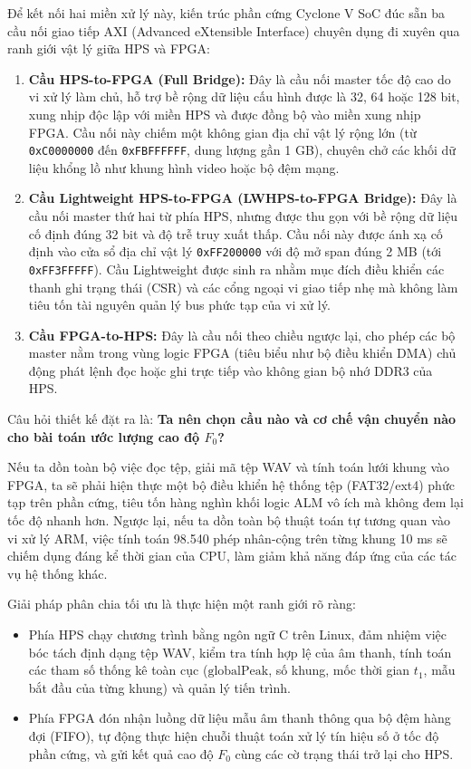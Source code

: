 Để kết nối hai miền xử lý này, kiến trúc phần cứng Cyclone V SoC đúc sẵn ba cầu nối giao tiếp AXI (Advanced eXtensible Interface) chuyên dụng đi xuyên qua ranh giới vật lý giữa HPS và FPGA:
\begin{enumerate}[leftmargin=1.5em, itemsep=3pt]
    \item \textbf{Cầu HPS-to-FPGA (Full Bridge):} Đây là cầu nối master tốc độ cao do vi xử lý làm chủ, hỗ trợ bề rộng dữ liệu cấu hình được là 32, 64 hoặc 128 bit, xung nhịp độc lập với miền HPS và được đồng bộ vào miền xung nhịp FPGA. Cầu nối này chiếm một không gian địa chỉ vật lý rộng lớn (từ \texttt{0xC0000000} đến \texttt{0xFBFFFFFF}, dung lượng gần 1 GB), chuyên chở các khối dữ liệu khổng lồ như khung hình video hoặc bộ đệm mạng.
    \item \textbf{Cầu Lightweight HPS-to-FPGA (LWHPS-to-FPGA Bridge):} Đây là cầu nối master thứ hai từ phía HPS, nhưng được thu gọn với bề rộng dữ liệu cố định đúng 32 bit và độ trễ truy xuất thấp. Cầu nối này được ánh xạ cố định vào cửa sổ địa chỉ vật lý \texttt{0xFF200000} với độ mở span đúng 2 MB (tới \texttt{0xFF3FFFFF}). Cầu Lightweight được sinh ra nhằm mục đích điều khiển các thanh ghi trạng thái (CSR) và các cổng ngoại vi giao tiếp nhẹ mà không làm tiêu tốn tài nguyên quản lý bus phức tạp của vi xử lý.
    \item \textbf{Cầu FPGA-to-HPS:} Đây là cầu nối theo chiều ngược lại, cho phép các bộ master nằm trong vùng logic FPGA (tiêu biểu như bộ điều khiển DMA) chủ động phát lệnh đọc hoặc ghi trực tiếp vào không gian bộ nhớ DDR3 của HPS.
\end{enumerate}

Câu hỏi thiết kế đặt ra là: \textbf{Ta nên chọn cầu nào và cơ chế vận chuyển nào cho bài toán ước lượng cao độ $F_0$?}

Nếu ta dồn toàn bộ việc đọc tệp, giải mã tệp WAV và tính toán lưới khung vào FPGA, ta sẽ phải hiện thực một bộ điều khiển hệ thống tệp (FAT32/ext4) phức tạp trên phần cứng, tiêu tốn hàng nghìn khối logic ALM vô ích mà không đem lại tốc độ nhanh hơn. Ngược lại, nếu ta dồn toàn bộ thuật toán tự tương quan vào vi xử lý ARM, việc tính toán 98.540 phép nhân-cộng trên từng khung 10 ms sẽ chiếm dụng đáng kể thời gian của CPU, làm giảm khả năng đáp ứng của các tác vụ hệ thống khác.

Giải pháp phân chia tối ưu là thực hiện một ranh giới rõ ràng:
\begin{itemize}[leftmargin=1.5em, itemsep=2pt]
    \item Phía HPS chạy chương trình bằng ngôn ngữ C trên Linux, đảm nhiệm việc bóc tách định dạng tệp WAV, kiểm tra tính hợp lệ của âm thanh, tính toán các tham số thống kê toàn cục ($\text{globalPeak}$, số khung, mốc thời gian $t_1$, mẫu bắt đầu của từng khung) và quản lý tiến trình.
    \item Phía FPGA đón nhận luồng dữ liệu mẫu âm thanh thông qua bộ đệm hàng đợi (FIFO), tự động thực hiện chuỗi thuật toán xử lý tín hiệu số ở tốc độ phần cứng, và gửi kết quả cao độ $F_0$ cùng các cờ trạng thái trở lại cho HPS.
\end{itemize}

